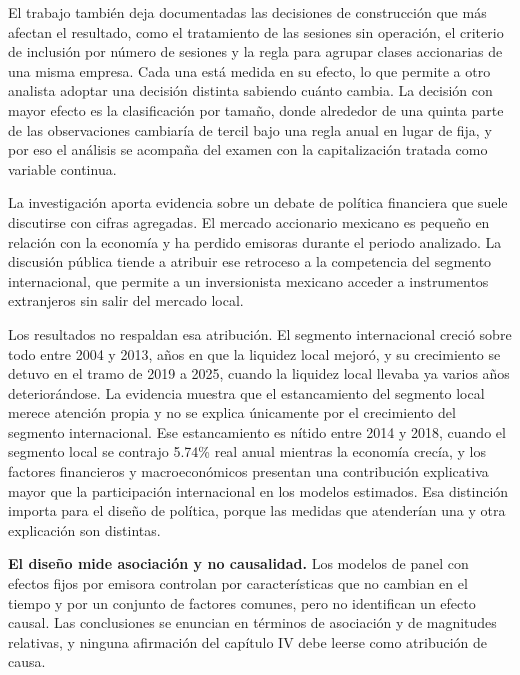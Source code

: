 El trabajo también deja documentadas las decisiones de construcción que más afectan el resultado, como el tratamiento de las sesiones sin operación, el criterio de inclusión por número de sesiones y la regla para agrupar clases accionarias de una misma empresa. Cada una está medida en su efecto, lo que permite a otro analista adoptar una decisión distinta sabiendo cuánto cambia. La decisión con mayor efecto es la clasificación por tamaño, donde alrededor de una quinta parte de las observaciones cambiaría de tercil bajo una regla anual en lugar de fija, y por eso el análisis se acompaña del examen con la capitalización tratada como variable continua.


La investigación aporta evidencia sobre un debate de política financiera que suele discutirse con cifras agregadas. El mercado accionario mexicano es pequeño en relación con la economía y ha perdido emisoras durante el periodo analizado. La discusión pública tiende a atribuir ese retroceso a la competencia del segmento internacional, que permite a un inversionista mexicano acceder a instrumentos extranjeros sin salir del mercado local.

Los resultados no respaldan esa atribución. El segmento internacional creció sobre todo entre 2004 y 2013, años en que la liquidez local mejoró, y su crecimiento se detuvo en el tramo de 2019 a 2025, cuando la liquidez local llevaba ya varios años deteriorándose. La evidencia muestra que el estancamiento del segmento local merece atención propia y no se explica únicamente por el crecimiento del segmento internacional. Ese estancamiento es nítido entre 2014 y 2018, cuando el segmento local se contrajo 5.74\% real anual mientras la economía crecía, y los factores financieros y macroeconómicos presentan una contribución explicativa mayor que la participación internacional en los modelos estimados. Esa distinción importa para el diseño de política, porque las medidas que atenderían una y otra explicación son distintas.



\textbf{El diseño mide asociación y no causalidad.} Los modelos de panel con efectos fijos por emisora controlan por características que no cambian en el tiempo y por un conjunto de factores comunes, pero no identifican un efecto causal. Las conclusiones se enuncian en términos de asociación y de magnitudes relativas, y ninguna afirmación del capítulo IV debe leerse como atribución de causa.

